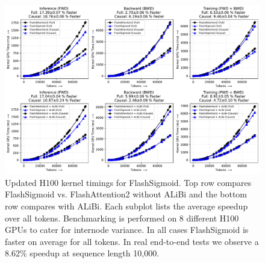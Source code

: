 \begin{figure}[ht]
  \begin{minipage}{0.7\textwidth}
    \centering
    \includegraphics[width=\linewidth]{figures/_flash_figures/rebuttal/H100_all_major.pdf}
  \end{minipage}%
  \hfill
  \begin{minipage}{0.29\textwidth}
    \caption{Updated H100 kernel timings for FlashSigmoid.
    Top row compares FlashSigmoid vs. FlashAttention2 without ALiBi and the bottom row compares with ALiBi.
    Each subplot lists the average speedup over all tokens. 
    Benchmarking is performed on 8 different H100 GPUs to cater for internode variance. 
    In all cases FlashSigmoid is faster on average for all tokens. In real end-to-end tests we observe a 8.62\% speedup at sequence length 10,000.
    }
    \label{fig:h100_kernel_benchmarking_rebuttal}
  \end{minipage}  
\end{figure}
\vspace{-0.1in}
